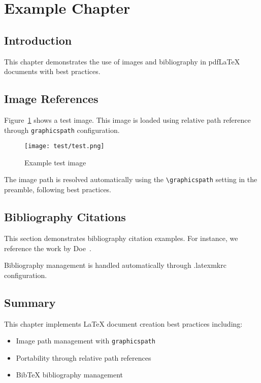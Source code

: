 \section{Example Chapter}

\subsection{Introduction}

This chapter demonstrates the use of images and bibliography in pdfLaTeX documents with best practices.

\subsection{Image References}

Figure~\ref{fig:test_image_pdf} shows a test image. This image is loaded using relative path reference through \texttt{graphicspath} configuration.

\begin{figure}[htbp]
    \centering
    \texttt{[image: test/test.png]}
    \caption{Example test image}
    \label{fig:test_image_pdf}
\end{figure}

The image path is resolved automatically using the \texttt{\textbackslash graphicspath} setting in the preamble, following best practices.

\subsection{Bibliography Citations}

This section demonstrates bibliography citation examples. For instance, we reference the work by Doe~\cite{example}.

Bibliography management is handled automatically through .latexmkrc configuration.

\subsection{Summary}

This chapter implements LaTeX document creation best practices including:

\begin{itemize}
    \item Image path management with \texttt{graphicspath}
    \item Portability through relative path references
    \item BibTeX bibliography management
\end{itemize}
